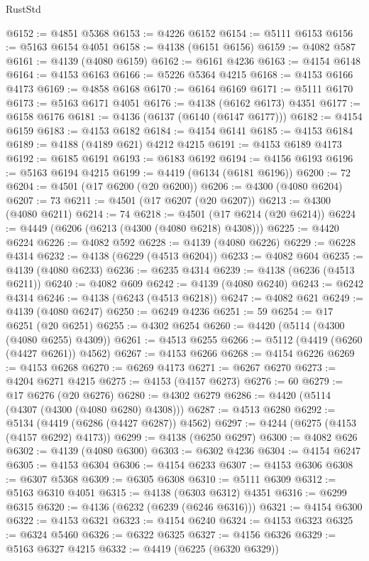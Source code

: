 \begin{lexlean}{RustStd}
\begin{coremodule}
@6152 := @4851 @5368
@6153 := @4226 @6152
@6154 := @5111 @6153
@6156 := @5163 @6154 @4051
@6158 := @4138 (@6151 @6156)
@6159 := @4082 @587
@6161 := @4139 (@4080 @6159)
@6162 := @6161 @4236
@6163 := @4154 @6148
@6164 := @4153 @6163
@6166 := @5226 @5364 @4215
@6168 := @4153 @6166 @4173
@6169 := @4858 @6168
@6170 := @6164 @6169
@6171 := @5111 @6170
@6173 := @5163 @6171 @4051
@6176 := @4138 (@6162 @6173) @4351
@6177 := @6158 @6176
@6181 := @4136 (@6137 (@6140 (@6147 @6177)))
@6182 := @4154 @6159
@6183 := @4153 @6182
@6184 := @4154 @6141
@6185 := @4153 @6184
@6189 := @4188 (@4189 @621) @4212 @4215
@6191 := @4153 @6189 @4173
@6192 := @6185 @6191
@6193 := @6183 @6192
@6194 := @4156 @6193
@6196 := @5163 @6194 @4215
@6199 := @4419 (@6134 (@6181 @6196))
@6200 := 72
@6204 := @4501 (@17 @6200 (@20 @6200))
@6206 := @4300 (@4080 @6204)
@6207 := 73
@6211 := @4501 (@17 @6207 (@20 @6207))
@6213 := @4300 (@4080 @6211)
@6214 := 74
@6218 := @4501 (@17 @6214 (@20 @6214))
@6224 := @4449 (@6206 (@6213 (@4300 (@4080 @6218) @4308)))
@6225 := @4420 @6224
@6226 := @4082 @592
@6228 := @4139 (@4080 @6226)
@6229 := @6228 @4314
@6232 := @4138 (@6229 (@4513 @6204))
@6233 := @4082 @604
@6235 := @4139 (@4080 @6233)
@6236 := @6235 @4314
@6239 := @4138 (@6236 (@4513 @6211))
@6240 := @4082 @609
@6242 := @4139 (@4080 @6240)
@6243 := @6242 @4314
@6246 := @4138 (@6243 (@4513 @6218))
@6247 := @4082 @621
@6249 := @4139 (@4080 @6247)
@6250 := @6249 @4236
@6251 := 59
@6254 := @17 @6251 (@20 @6251)
@6255 := @4302 @6254
@6260 := @4420 (@5114 (@4300 (@4080 @6255) @4309))
@6261 := @4513 @6255
@6266 := @5112 (@4419 (@6260 (@4427 @6261)) @4562)
@6267 := @4153 @6266
@6268 := @4154 @6226
@6269 := @4153 @6268
@6270 := @6269 @4173
@6271 := @6267 @6270
@6273 := @4204 @6271 @4215
@6275 := @4153 (@4157 @6273)
@6276 := 60
@6279 := @17 @6276 (@20 @6276)
@6280 := @4302 @6279
@6286 := @4420 (@5114 (@4307 (@4300 (@4080 @6280) @4308)))
@6287 := @4513 @6280
@6292 := @5134 (@4419 (@6286 (@4427 @6287)) @4562)
@6297 := @4244 (@6275 (@4153 (@4157 @6292) @4173))
@6299 := @4138 (@6250 @6297)
@6300 := @4082 @626
@6302 := @4139 (@4080 @6300)
@6303 := @6302 @4236
@6304 := @4154 @6247
@6305 := @4153 @6304
@6306 := @4154 @6233
@6307 := @4153 @6306
@6308 := @6307 @5368
@6309 := @6305 @6308
@6310 := @5111 @6309
@6312 := @5163 @6310 @4051
@6315 := @4138 (@6303 @6312) @4351
@6316 := @6299 @6315
@6320 := @4136 (@6232 (@6239 (@6246 @6316)))
@6321 := @4154 @6300
@6322 := @4153 @6321
@6323 := @4154 @6240
@6324 := @4153 @6323
@6325 := @6324 @5460
@6326 := @6322 @6325
@6327 := @4156 @6326
@6329 := @5163 @6327 @4215
@6332 := @4419 (@6225 (@6320 @6329))

\end{coremodule}
\end{lexlean}
